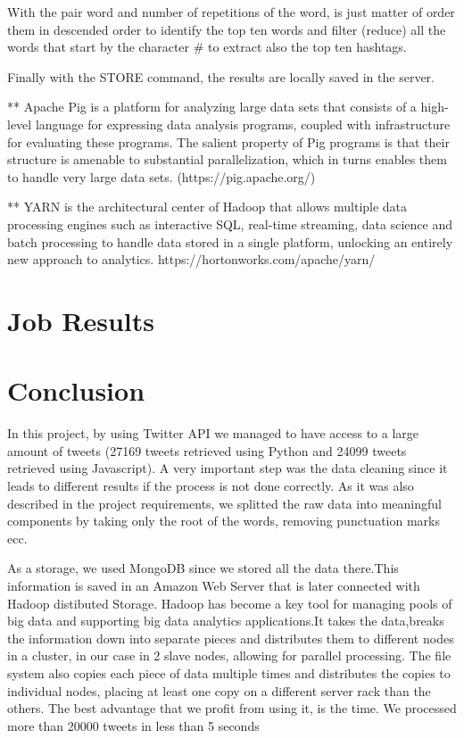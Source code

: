 \documentclass{article}
\begin{document}
        With the pair word and number of repetitions of the word, is just matter of order them in descended order to identify the top ten words and filter (reduce) all the words that start by the character \# to 
        extract also the top ten hashtags.

        Finally with the STORE command, the results are locally saved in the server.

        ** Apache Pig is a platform for analyzing large data sets that consists of a high-level language for expressing data analysis programs, coupled with infrastructure for evaluating these programs. 
        The salient property of Pig programs is that their structure is amenable to substantial parallelization, which in turns enables them to handle very large data sets. 
        (https://pig.apache.org/)

        ** YARN is the architectural center of Hadoop that allows multiple data processing engines such as interactive SQL, real-time streaming, data science and batch processing to handle data stored 
        in a single platform, unlocking an entirely new approach to analytics.
        https://hortonworks.com/apache/yarn/
        \section{Job Results}
		\pagebreak        
        \section{Conclusion}
In this project, by using Twitter API we managed to have access to a large amount of tweets (27169 tweets retrieved using Python and 24099 tweets retrieved using Javascript). A very important step was the data cleaning since it leads to different results if the process is not done correctly. As it was also described in the project requirements, we splitted the raw data into meaningful components by taking only the root of the words, removing punctuation marks ecc.

 As a storage, we used MongoDB since we stored all the data there.This information is saved in an Amazon Web Server that is later connected with Hadoop distibuted Storage. Hadoop has become a key tool for managing pools of big data and supporting big data analytics applications.It takes the data,breaks the information down into separate pieces and distributes them to different nodes in a cluster, in our case in 2 slave nodes, allowing for parallel processing. The file system also copies each piece of data multiple times and distributes the copies to individual nodes, placing at least one copy on a different server rack than the others. The best advantage that we profit from using it, is the time. We processed more than 20000 tweets in less than 5 seconds
\end{document}

